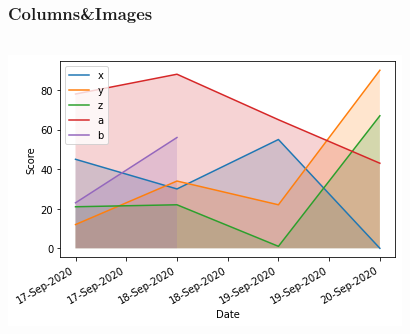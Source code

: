 \documentclass{beamer}
\begin{document}
\begin{frame}
	\frametitle{Columns\&Images}
			
				\begin{columns}
					
						\blindtext
				
					\includegraphics[height=\textwidth,keepaspectratio,angle=270]{5_beamerPPT.png}
				
				\end{columns}

\end{frame}
\end{document}
